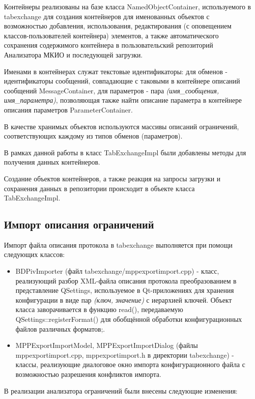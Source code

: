 Контейнеры реализованы на базе класса NamedObjectContainer, используемого в 
tabexchange для создания контейнеров для именованных объектов с возможностью 
добавления, использования, редактирования (с оповещением классов-пользователей 
контейнера) элементов, а также автоматического сохранения содержимого 
контейнера в пользовательский репозиторий Анализатора МКИО и последующей 
загрузки.

Именами в контейнерах служат текстовые идентификаторы: для обменов - 
идентификаторы сообщений, совпадающие с таковыми в контейнере описаний 
сообщений MessageContainer, для параметров - пара \textit{(имя\_сообщения, 
имя\_параметра)}, позволяющая также найти описание параметра в 
контейнере описания параметров ParameterContainer.

В качестве хранимых объектов используются массивы описаний ограничений, 
соответствующих каждому из типов обменов (параметров).

В рамках данной работы в класс TabExchangeImpl были добавлены методы для 
получения данных контейнеров.

Создание объектов контейнеров, а также реакция на запросы загрузки и сохранения 
данных в репозитории происходит в объекте класса TabExchangeImpl.

\subsection{Импорт описания ограничений}

Импорт файла описания протокола в tabexchange выполняется при помощи следующих 
классов:

\begin{itemize}
 \item BDPivImporter (файл tabexchange/mppexportimport.cpp) - класс, 
реализующий разбор XML-файла описания протокола преобразованием в представление 
QSettings, используемое в Qt-приложениях для хранения конфигурации в виде пар 
\textit{(ключ, значение)} с иерархией ключей. Объект класса заворачивается в 
функцию read(), передаваемую QSettings::registerFormat() для обобщённой 
обработки конфигурационных файлов различных форматов;.
 \item MPPExportImportModel, MPPExportImportDialog (файлы 
mppexportimport.cpp, mppexportimport.h в директории tabexchange) - классы, 
реализующие диалоговое окно импорта конфигурационного файла с возможностью 
разрешения конфликтов импорта.
\end{itemize}

В реализации анализатора ограничений были внесены следующие изменения:

